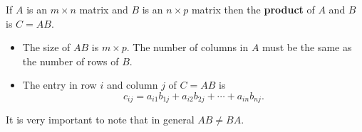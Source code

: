 \begin{definition}
    If $A$ is an $m \times n$ matrix and $B$ is an $n \times p$ matrix then the {\bf
    product} of $A$ and $B$ is $C=AB$.
    \begin{itemize}
        \item The size of $AB$ is $m \times p$.  The number of columns in $A$ must be the
            same as the number of rows of $B$.
        \item The entry in row $i$ and column $j$ of $C=AB$ is
            \[ c_{ij} = a_{i1} b_{1j} + a_{i2} b_{2j} + \cdots + a_{in} b_{nj}. \]
    \end{itemize}

    It is very important to note that in general $AB \ne BA$.
\end{definition}


